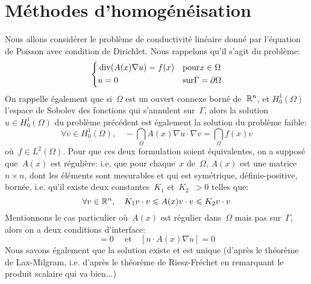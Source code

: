 \section{Méthodes d'homogénéisation}
Nous allons considérer le problème de conductivité linéaire donné par
l'équation de Poisson
avec condition de Dirichlet.
Nous rappelons qu'il s'agit du problème:
\begin{equation}
\left\{
\begin{aligned}
&\operatorname{div}(A(x)\nabla u) = f(x)&&\text{pour} x\in\Omega\\
&u=0 &&\text{sur} \Gamma=\partial\Omega
\end{aligned}
\right.
\end{equation}
On rappelle également que si~$\Omega$ est un ouvert connexe borné de~$\mathbb R^n$, et
$H_0^1(\Omega)$ l'espace de Sobolev des fonctions qui s'annulent sur~$\Gamma$, alors la solution
$u\in H_0^1(\Omega)$ du problème précédent est également la solution du problème
faible:
\begin{equation}
\forall v\in H_0^1(\Omega),\quad -\dint_\Omega A(x)\nabla u\cdot\nabla v = \dint_\Omega f(x)v
\end{equation}
où~$f\in L^2(\Omega)$.
Pour que ces deux formulation soient équivalentes, on a supposé que~$A(x)$ est
régulière: i.e. que pour chaque~$x$ de~$\Omega$, $A(x)$ est une matrice~$n\times n$,
dont les éléments sont mesurables et qui est symétrique, définie-positive, bornée, i.e. qu'il existe
deux constantes~$K_1$ et~$K_2$~$>0$ telles que:
\begin{equation}\forall v\in\mathbb R^n,\quad K_1 v\cdot v \leqslant A(x) v\cdot v \leqslant K_2 v\cdot v\end{equation}
Mentionnons le cas particulier où~$A(x)$ est régulier dans~$\Omega$ mais
pas sur~$\Gamma$, alors on a deux conditions d'interface:
\begin{equation}
[u]=0 \quad\text{ et}\quad [n\cdot A(x)\nabla u]=0
\end{equation}
Nous savons également que la solution existe et est unique (d'après le théorème de Lax-Milgram,
 i.e. d'après le théorème de Riesz-Fréchet
en remarquant le produit scalaire qui va bien...)

